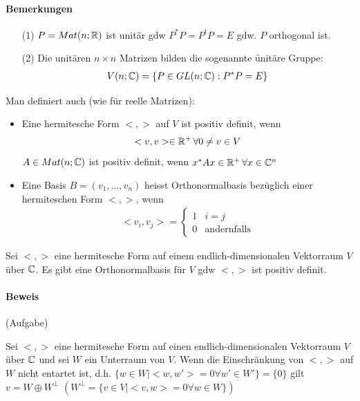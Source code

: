 \paragraph{Bemerkungen}
\begin{itemize}
\item[(1)] $P = Mat(n; \mathbb{R})$ ist unitär gdw $P^{*}P = P^{t} P = E$ gdw. $P$ orthogonal ist.
\item[(2)] Die unitären $n \times n$ Matrizen bilden die sogenannte \f{unitäre Gruppe}:
\begin{align}
V(n; \mathbb{C}) = \{P \in GL(n; \mathbb{C}): P^{*} P = E\}
\end{align}
\end{itemize}
Man definiert auch (wie für reelle Matrizen):
\begin{itemize}
\item Eine hermitesche Form $<, >$ auf $V$ ist positiv definit, wenn 
\begin{align}
<v, v> \in \mathbb{R}^{+} \,\forall 0 \neq v \in V
\end{align}
$A \in Mat(n; \mathbb{C})$ ist positiv definit, wenn $x^{*} A x \in \mathbb{R}^{+} \,\forall x \in \mathbb{C}^n$
\item Eine Basis $B = (v_1, ..., v_n)$ heisst Orthonormalbasis bezüglich einer hermiteschen Form $<, >$, wenn
\begin{align}
<v_i, v_j> = \left\{ \begin{matrix} 1 & i=j \\ 0 & \text{andernfalls} \end{matrix} \right.
\end{align}
\end{itemize}

\begin{satz} %
\label{satz542}
Sei $<, >$ eine hermitesche Form auf einem endlich-dimensionalen Vektorraum $V$ über $\mathbb{C}$. Es gibt eine Orthonormalbasis für $V$ gdw $<, >$ ist positiv definit.
\end{satz}

\paragraph{Beweis}
(Aufgabe)

\begin{satz} %
\label{satz543}
Sei $<, >$ eine hermitesche Form auf einen endlich-dimensionalen Vektorraum $V$ über $\mathbb{C}$ und sei $W$ ein Unterraum von $V$. Wenn die Einschränkung von $<, >$ auf $W$ nicht entartet ist, d.h. $\{w \in W | <w, w'> = 0 \forall w' \in W'\} = \{0\}$ gilt $v = W \oplus W^{\perp}$ $(W^{\perp} = \{v \in V|<v, w> = 0 \forall w \in W\})$
\end{satz}

